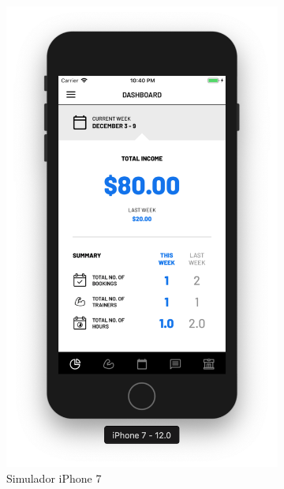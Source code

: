 \begin{figure}[H]
\begin{subfigure}[b]{0.3\textwidth}
        \includegraphics[width=\textwidth]{pfc/figuras/7.png}
        \caption{Simulador iPhone 7}
        \label{fig:7}
    \end{subfigure}
    ~
    \begin{subfigure}[b]{0.3\textwidth}

\end{subfigure}
\end{figure}
